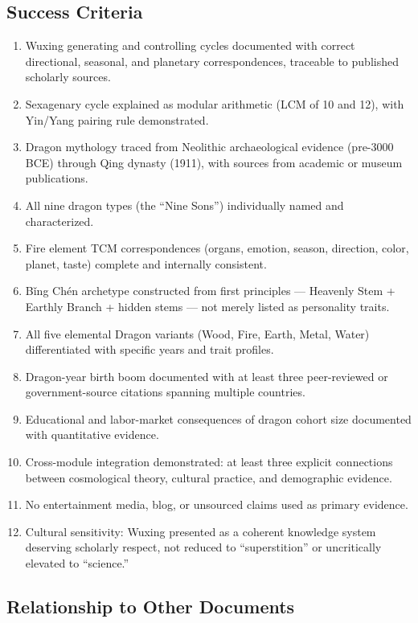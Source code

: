 \documentclass[11pt,letterpaper]{article}
\begin{document}
\subsection{Success Criteria}

\begin{enumerate}[leftmargin=2em]
\item Wuxing generating and controlling cycles documented with correct directional, seasonal, and planetary correspondences, traceable to published scholarly sources.
\item Sexagenary cycle explained as modular arithmetic (LCM of 10 and 12), with Yin/Yang pairing rule demonstrated.
\item Dragon mythology traced from Neolithic archaeological evidence (pre-3000 BCE) through Qing dynasty (1911), with sources from academic or museum publications.
\item All nine dragon types (the ``Nine Sons'') individually named and characterized.
\item Fire element TCM correspondences (organs, emotion, season, direction, color, planet, taste) complete and internally consistent.
\item Bǐng Chén archetype constructed from first principles --- Heavenly Stem + Earthly Branch + hidden stems --- not merely listed as personality traits.
\item All five elemental Dragon variants (Wood, Fire, Earth, Metal, Water) differentiated with specific years and trait profiles.
\item Dragon-year birth boom documented with at least three peer-reviewed or government-source citations spanning multiple countries.
\item Educational and labor-market consequences of dragon cohort size documented with quantitative evidence.
\item Cross-module integration demonstrated: at least three explicit connections between cosmological theory, cultural practice, and demographic evidence.
\item No entertainment media, blog, or unsourced claims used as primary evidence.
\item Cultural sensitivity: Wuxing presented as a coherent knowledge system deserving scholarly respect, not reduced to ``superstition'' or uncritically elevated to ``science.''
\end{enumerate}

\subsection{Relationship to Other Documents}
\end{document}
